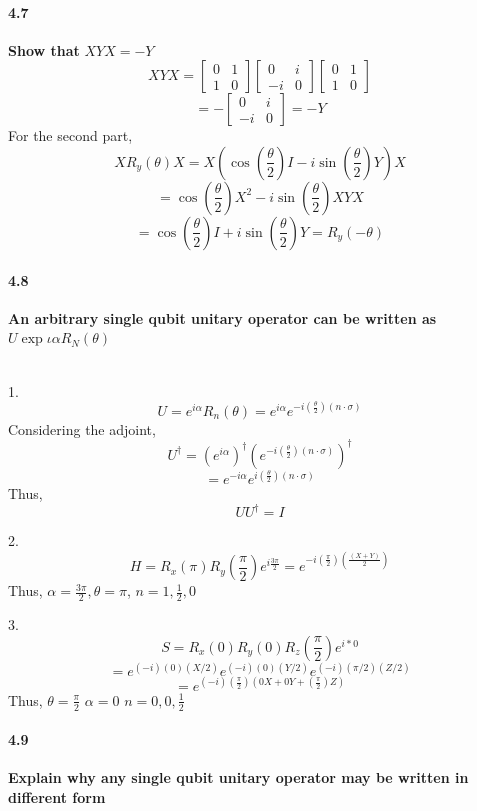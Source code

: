 \paragraph{4.7} \textbf{Show that } $XYX = -Y$
\\
$$XYX = \begin{bmatrix} 0& 1\\1 & 0 \end{bmatrix} \begin{bmatrix} 0& i\\-i & 0 \end{bmatrix} \begin{bmatrix} 0& 1\\1 & 0 \end{bmatrix}$$
$$= -\begin{bmatrix} 0& i\\-i & 0 \end{bmatrix} = -Y$$
For the second part, 
$$XR_y(\theta)X = X(\cos(\frac{\theta}{2}) I - i\sin(\frac{\theta}{2})Y)X$$
$$= \cos(\frac{\theta}{2})X^2 - i\sin(\frac{\theta}{2})XYX$$
$$= \cos(\frac{\theta}{2})I + i\sin(\frac{\theta}{2})Y = R_y(-\theta)$$

\paragraph{4.8} \textbf{An arbitrary single qubit unitary operator can be written as} $ U \exp{\iota \alpha} R_N (\theta) $

\\

1. 
$$U = e^{i\alpha}R_n(\theta) = e^{i\alpha}e^{-i(\frac{\theta}{2})(n \cdot \sigma)}$$
Considering the adjoint,
$$U^{\dagger} = (e^{i\alpha})^{\dagger}(e^{-i(\frac{\theta}{2})(n \cdot \sigma)})^{\dagger}$$$$= e^{-i\alpha}e^{i(\frac{\theta}{2})(n \cdot \sigma)}$$
Thus,
$$UU^{\dagger} =  I$$


2. 
$$H = R_x(\pi)R_y(\frac{\pi}{2})e^{i\frac{3\pi}{2}} = e^{-i(\frac{\pi}{2})(\frac{(X+Y)}{2})}$$
Thus,
$\alpha = \frac{3\pi}{2}$$,$$\theta = \pi$, $n = 1, \frac{1}{2}, 0$


3. 
$$S = R_x(0)R_y(0)R_z(\frac{\pi}{2})e^{i*0}$$ 
$$ = e^{(-i)(0)(X/2)}e^{(-i)(0)(Y/2)}e^{(-i)(\pi /2)(Z/2)}$$
$$= e^{(-i)(\frac{\pi}{2})(0X + 0Y + (\frac{\pi}{2})Z)}$$
Thus, 
$\theta = \frac{\pi}{2}$
$\alpha = 0$
$n = 0, 0, \frac{1}{2}$

\paragraph{4.9} \textbf{Explain why any single qubit unitary operator may  be written in different form}
\\

